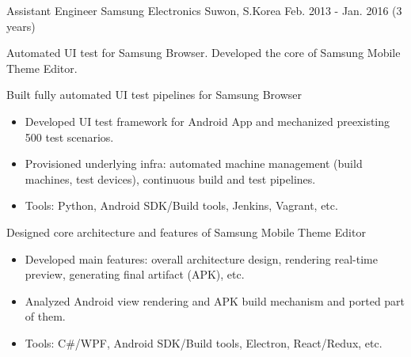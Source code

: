 \begin{cventries}
  \cventry
    {Assistant Engineer} %
    {Samsung Electronics} %
    {Suwon, S.Korea} %
    {Feb. 2013 - Jan. 2016 (3 years)} %
    {
      Automated UI test for Samsung Browser. Developed the core of Samsung Mobile Theme Editor.\newline
      \vspace{6mm}
      \begin{cvitems} %
        \item Built fully automated UI test pipelines for Samsung Browser
        \begin{itemize}[leftmargin=2ex]
          \item Developed UI test framework for Android App and mechanized preexisting 500 test scenarios.
          \item Provisioned underlying infra: automated machine management (build machines, test devices), continuous build and test pipelines.
          \item Tools: Python, Android SDK/Build tools, Jenkins, Vagrant, etc.
        \end{itemize}
        \item Designed core architecture and features of Samsung Mobile Theme Editor
        \begin{itemize}[leftmargin=2ex]
          \item Developed main features: overall architecture design, rendering real-time preview, generating final artifact (APK), etc.
          \item Analyzed Android view rendering and APK build mechanism and ported part of them.
          \item Tools: C\#/WPF, Android SDK/Build tools, Electron, React/Redux, etc.
        \end{itemize}
      \end{cvitems}
    }

\end{cventries}
